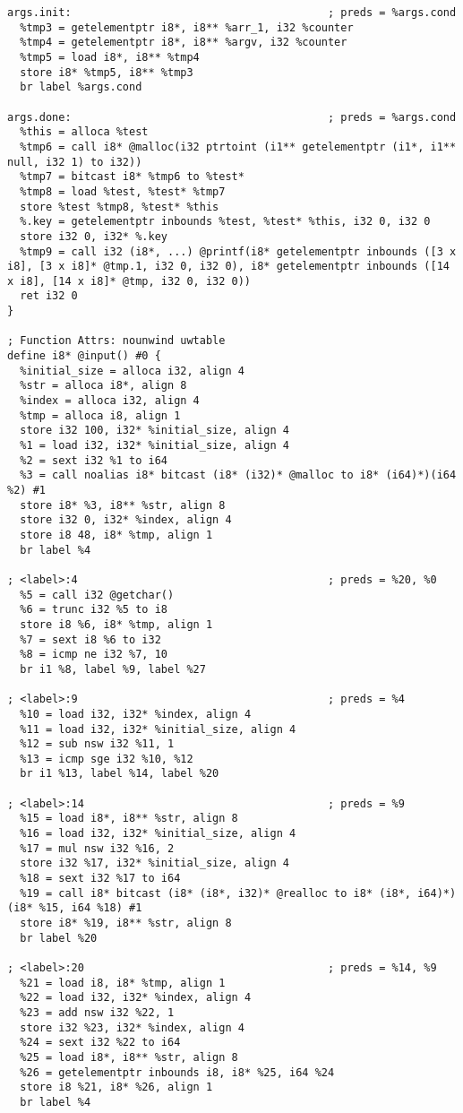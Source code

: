 \begin{verbatim}
args.init:                                        ; preds = %args.cond
  %tmp3 = getelementptr i8*, i8** %arr_1, i32 %counter
  %tmp4 = getelementptr i8*, i8** %argv, i32 %counter
  %tmp5 = load i8*, i8** %tmp4
  store i8* %tmp5, i8** %tmp3
  br label %args.cond

args.done:                                        ; preds = %args.cond
  %this = alloca %test
  %tmp6 = call i8* @malloc(i32 ptrtoint (i1** getelementptr (i1*, i1** null, i32 1) to i32))
  %tmp7 = bitcast i8* %tmp6 to %test*
  %tmp8 = load %test, %test* %tmp7
  store %test %tmp8, %test* %this
  %.key = getelementptr inbounds %test, %test* %this, i32 0, i32 0
  store i32 0, i32* %.key
  %tmp9 = call i32 (i8*, ...) @printf(i8* getelementptr inbounds ([3 x i8], [3 x i8]* @tmp.1, i32 0, i32 0), i8* getelementptr inbounds ([14 x i8], [14 x i8]* @tmp, i32 0, i32 0))
  ret i32 0
}

; Function Attrs: nounwind uwtable
define i8* @input() #0 {
  %initial_size = alloca i32, align 4
  %str = alloca i8*, align 8
  %index = alloca i32, align 4
  %tmp = alloca i8, align 1
  store i32 100, i32* %initial_size, align 4
  %1 = load i32, i32* %initial_size, align 4
  %2 = sext i32 %1 to i64
  %3 = call noalias i8* bitcast (i8* (i32)* @malloc to i8* (i64)*)(i64 %2) #1
  store i8* %3, i8** %str, align 8
  store i32 0, i32* %index, align 4
  store i8 48, i8* %tmp, align 1
  br label %4

; <label>:4                                       ; preds = %20, %0
  %5 = call i32 @getchar()
  %6 = trunc i32 %5 to i8
  store i8 %6, i8* %tmp, align 1
  %7 = sext i8 %6 to i32
  %8 = icmp ne i32 %7, 10
  br i1 %8, label %9, label %27

; <label>:9                                       ; preds = %4
  %10 = load i32, i32* %index, align 4
  %11 = load i32, i32* %initial_size, align 4
  %12 = sub nsw i32 %11, 1
  %13 = icmp sge i32 %10, %12
  br i1 %13, label %14, label %20

; <label>:14                                      ; preds = %9
  %15 = load i8*, i8** %str, align 8
  %16 = load i32, i32* %initial_size, align 4
  %17 = mul nsw i32 %16, 2
  store i32 %17, i32* %initial_size, align 4
  %18 = sext i32 %17 to i64
  %19 = call i8* bitcast (i8* (i8*, i32)* @realloc to i8* (i8*, i64)*)(i8* %15, i64 %18) #1
  store i8* %19, i8** %str, align 8
  br label %20

; <label>:20                                      ; preds = %14, %9
  %21 = load i8, i8* %tmp, align 1
  %22 = load i32, i32* %index, align 4
  %23 = add nsw i32 %22, 1
  store i32 %23, i32* %index, align 4
  %24 = sext i32 %22 to i64
  %25 = load i8*, i8** %str, align 8
  %26 = getelementptr inbounds i8, i8* %25, i64 %24
  store i8 %21, i8* %26, align 1
  br label %4


\end{verbatim}
